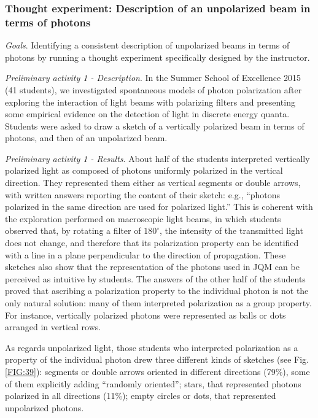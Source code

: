 \documentclass[twocolumn,secnumarabic,amssymb, nobibnotes, aps, prd, nofootinbib]{revtex4-2}
\begin{document}
\subsubsection{Thought experiment: Description of an unpolarized beam in terms of photons} \label{Sec:5.4.2}

\emph{Goals}. Identifying a consistent description of unpolarized beams in terms of photons by running a thought experiment specifically designed by the instructor.

\emph{Preliminary activity 1 - Description}. In the Summer School of Excellence 2015 (41 students), we investigated spontaneous models of photon polarization after exploring the interaction of light beams with polarizing filters and presenting some empirical evidence on the detection of light in discrete energy quanta. Students were asked to draw a sketch of a vertically polarized beam in terms of photons, and then of an unpolarized beam.

\emph{Preliminary activity 1 - Results}. About half of the students interpreted vertically polarized light as composed of photons uniformly polarized in the vertical direction. They represented them either as vertical segments or double arrows, with written answers reporting the content of their sketch: e.g., ``photons polarized in the same direction are used for polarized light.'' This is coherent with the exploration performed on macroscopic light beams, in which students observed that, by rotating a filter of $180^{\circ}$, the intensity of the transmitted light does not change, and therefore that its polarization property can be identified with a line in a plane perpendicular to the direction of propagation. These sketches also show that the representation of the photons used in JQM can be perceived as intuitive by students. The answers of the other half of the students proved that ascribing a polarization property to the individual photon is not the only natural solution: many of them interpreted polarization as a group property. For instance, vertically polarized photons were represented as balls or dots arranged in vertical rows.

As regards unpolarized light, those students who interpreted polarization as a property of the individual photon drew three different kinds of sketches (see Fig. \ref{FIG:39}): segments or double arrows oriented in different directions (79\%), some of them explicitly adding ``randomly oriented''; stars, that represented photons polarized in all directions (11\%); empty circles or dots, that represented unpolarized photons.
\begin{figure*}[!htpb]
    \caption{Spontaneous models of unpolarized light in terms of photons: Summer School of Excellence, Udine, 2015}
    \label{FIG:39}
\end{figure*}
\end{document}
